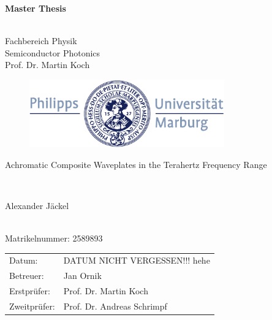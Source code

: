 \documentclass[12pt, a4paper]{report}
\begin{document}
\captionsetup[subfigure]{justification=justified,singlelinecheck=false}

\begin{titlepage}
  \vspace{3cm}
  \thispagestyle{empty}
  \begin{center}
    \begin{LARGE}
      \textbf{Master Thesis}
    \end{LARGE}\\
    Fachbereich Physik \\
    Semiconductor Photonics \\
    Prof. Dr. Martin Koch
    \\[1cm]
    \begin{figure}[h]
    \hspace{0.8cm}
      \centering
      \includegraphics[width=0.75\textwidth]{images/title_logo.pdf}
    \end{figure}
    \vspace{2cm}
    \begin{LARGE}
      Achromatic Composite Waveplates in the Terahertz Frequency Range
    \end{LARGE}\\[2cm]
    \begin{LARGE}
      Alexander Jäckel
    \end{LARGE}
    \\
    Matrikelnummer: 2589893
  \end{center}
  \vfill
    \noindent\begin{tabular}{ll}
      Datum: & DATUM NICHT VERGESSEN!!! hehe \\
      Betreuer: & Jan Ornik \\
      Erstprüfer: & Prof. Dr. Martin Koch \\
      Zweitprüfer: & Prof. Dr. Andreas Schrimpf  \\
    \end{tabular}
\end{titlepage}
\end{document}
